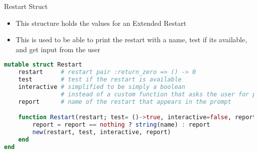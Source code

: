 \documentclass{beamer}
\begin{document}
\begin{frame}[fragile,t]{Restart Struct}

\begin{itemize}
    \item This structure holds the values for an Extended Restart
    \item This is used to be able to print the restart with a name, test if its available, and get input from the user
\end{itemize}
\vfill
\begin{lstlisting}[language=julia, style=jlcodestyle,]
mutable struct Restart
    restart     # restart pair :return_zero => () -> 0
    test        # test if the restart is available
    interactive # simplified to be simply a boolean
                # instead of a custom function that asks the user for parameters
    report      # name of the restart that appears in the prompt

    function Restart(restart; test= ()->true, interactive=false, report=nothing)
        report = report == nothing ? string(name) : report
        new(restart, test, interactive, report)
    end
end
\end{lstlisting}
\end{frame}
\end{document}
